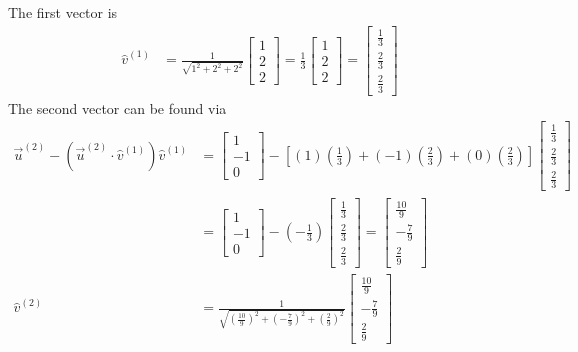 \begin{solution}
The first vector is
\begin{align*}
\hat{v}^{(1)} &= \frac{1}{\sqrt{1^2+2^2+2^2}}
\begin{bmatrix}
1 \\
2 \\
2
\end{bmatrix} 
= 
\frac{1}{3}
\begin{bmatrix}
1 \\
2 \\
2
\end{bmatrix} 
=
\begin{bmatrix}
\frac{1}{3} \\
\frac{2}{3} \\
\frac{2}{3}
\end{bmatrix}
\end{align*}
The second vector can be found via
\begin{align*}
\vec{u}^{(2)} - (\vec{u}^{(2)} \cdot \hat{v}^{(1)})\hat{v}^{(1)} &= 
\begin{bmatrix}
1 \\
-1 \\
0
\end{bmatrix} 
-
[(1)(\frac{1}{3}) + (-1)(\frac{2}{3}) + (0)(\frac{2}{3})]
\begin{bmatrix}
\frac{1}{3} \\
\frac{2}{3} \\
\frac{2}{3}
\end{bmatrix} \\
&= 
\begin{bmatrix}
1 \\
-1 \\
0
\end{bmatrix}
- (-\frac{1}{3})
\begin{bmatrix}
\frac{1}{3} \\
\frac{2}{3} \\
\frac{2}{3}
\end{bmatrix}
=
\begin{bmatrix}
\frac{10}{9} \\
-\frac{7}{9} \\
\frac{2}{9}
\end{bmatrix} \\
\hat{v}^{(2)} &= \frac{1}{\sqrt{(\frac{10}{9})^2+(-\frac{7}{9})^2+(\frac{2}{9})^2}}
\begin{bmatrix}
\frac{10}{9} \\
-\frac{7}{9} \\
\frac{2}{9}
\end{bmatrix}

\end{align*}
\end{solution}
